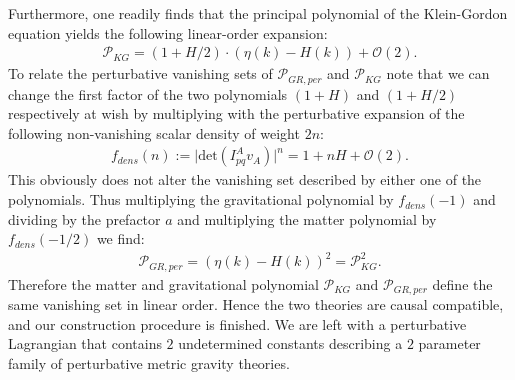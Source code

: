 Furthermore, one readily finds that the principal polynomial of the Klein-Gordon equation yields the following linear-order expansion:
\begin{align}
    \mathcal{P}_{KG} = (1 + H/2) \cdot (\eta(k) - H(k)) + \mathcal{O}(2) .
\end{align}
To relate the perturbative vanishing sets of $\mathcal{P}_{GR,per}$ and $\mathcal{P}_{KG}$ note that we can change the first factor of the two polynomials $(1+H)$ and $(1+H/2)$ respectively at wish by multiplying with the perturbative expansion of the following non-vanishing scalar density of weight $2n$:
\begin{align}
    f_{dens}(n) := \vert \mathrm{det}\left (I^A_{pq}v_A \right )\vert ^n = 1 + nH + \mathcal{O}(2).
\end{align}
This obviously does not alter the vanishing set described by either one of the polynomials. Thus multiplying the gravitational polynomial by $f_{dens}(-1)$ and dividing by the prefactor $a$ and multiplying the matter polynomial by $f_{dens}(-1/2)$ we find:
\begin{align}
    \mathcal{P}_{GR,per} = (\eta(k)-H(k))^2 = \mathcal{P}_{KG}^2.
\end{align}
Therefore the matter and gravitational polynomial $\mathcal{P}_{KG}$ and $\mathcal{P}_{GR,per}$ define the same vanishing set in linear order.
Hence the two theories are causal compatible, and our construction procedure is finished. We are left with a perturbative Lagrangian that contains $2$ undetermined constants describing a $2$ parameter family of perturbative metric gravity theories.  

